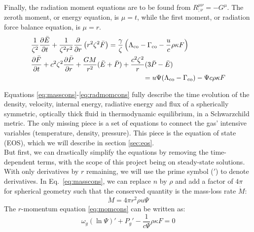 \documentclass[../main.tex]{subfiles}
\newcommand{\Partial}[2]{\frac{\partial}{\partial#1}\left(#2\right)} %
\begin{document}
Finally, the radiation moment equations are to be found from 
$R^{\mu\nu}_{;\nu}=-G^\mu$. The zeroth moment, or energy equation, is $\mu=t$, while the first moment, or radiation force balance equation, is $\mu=r$.
\begin{align}
    &\frac{1}{\zeta^2}\frac{\partial \bar{E}}{\partial t}+\frac{1}{\zeta^2r^2}\Partial{r}{r^2\zeta^2\bar{F}}=\frac{\gamma}{\zeta}\left(\Lambda_\text{co}-\Gamma_\text{co}-\frac{u}{c}\rho\kappa F\right)\label{eq:radenercons}\\
    &\frac{\partial \bar{F}}{\partial t}+c^2\zeta^2\frac{\partial\bar{P}}{\partial r}+\frac{GM}{r^2}(\bar{E}+\bar{P})+\frac{c^2\zeta^2}{r}(3\bar{P}-\bar{E})\nonumber\\
    &\hspace*{5cm}\qquad=u\Psi(\Lambda_\text{co}-\Gamma_\text{co})-\Psi c\rho\kappa F\label{eq:radmomcons}
\end{align}

Equations \eqref{eq:masscons}-\eqref{eq:radmomcons} fully describe the time evolution of the density, velocity, internal energy, radiative energy and flux of a spherically symmetric, optically thick fluid in thermodynamic equilibrium, in a Schwarzchild metric. The only missing piece is a set of equations to connect the gas' intensive variables (temperature, density, pressure). This piece is the equation of state (EOS), which we will describe in section \ref{sec:eos}. \\ 

But first, we can drastically simplify the equations by removing the time-dependent terms, with the scope of this project being on steady-state solutions. With only derivatives by $r$ remaining, we will use the prime symbol ($'$) to denote derivatives. In Eq.~\eqref{eq:masscons}, we can replace $n$ by $\rho$ and add a factor of $4\pi$ for spherical geometry such that the conserved quantity is the mass-loss rate $\dot{M}$:
\begin{equation}\label{eq:Mdot}
    \boxed{\dot{M}=4\pi r^2\rho u\Psi}
\end{equation}
The $r$-momentum equation \eqref{eq:momcons} can be written as:
\begin{equation}\label{eq:stationarymomcons}
     \boxed{\omega_g(\ln\Psi)' + P_g' - \frac{1}{c\Psi}\rho\kappa F = 0}
\end{equation}
\end{document}
